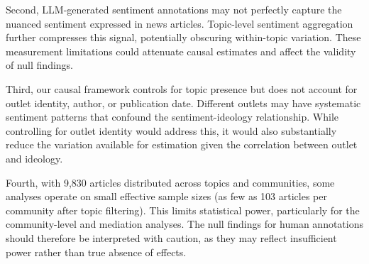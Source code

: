 Second, LLM-generated sentiment annotations may not perfectly capture the nuanced sentiment expressed in news articles. Topic-level sentiment aggregation further compresses this signal, potentially obscuring within-topic variation. These measurement limitations could attenuate causal estimates and affect the validity of null findings.

Third, our causal framework controls for topic presence but does not account for outlet identity, author, or publication date. Different outlets may have systematic sentiment patterns that confound the sentiment-ideology relationship. While controlling for outlet identity would address this, it would also substantially reduce the variation available for estimation given the correlation between outlet and ideology.

Fourth, with 9,830 articles distributed across topics and communities, some analyses operate on small effective sample sizes (as few as 103 articles per community after topic filtering). This limits statistical power, particularly for the community-level and mediation analyses. The null findings for human annotations should therefore be interpreted with caution, as they may reflect insufficient power rather than true absence of effects.
